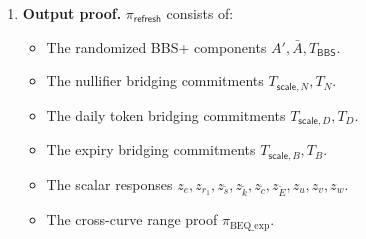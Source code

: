 \documentclass[11pt]{article}
\theoremstyle{definitionstyle}
\theoremstyle{plain}
\begin{document}
\begin{enumerate}[leftmargin=*]
\begin{align*}
    z_e &= \rho_e + c \cdot e_{\mathsf{sub}}, & z_{r_1} &= \rho_{r_1} + c \cdot r_1, \\
    z_{\tilde{s}} &= \rho_{\tilde{s}} + c \cdot \tilde{s}, & z_{\tilde{k}} &= \rho_{\tilde{k}} + c \cdot \tilde{k}, \\
    z_{\tilde{c}} &= \rho_{\tilde{c}} + c \cdot \tilde{c}, & z_{\tilde{E}} &= \rho_{\tilde{E}} + c \cdot \tilde{E}, \\
    z_u &= \rho_u + c \cdot (k_{\mathsf{daily}} r_1), & z_v &= \rho_v + c \cdot (r_{\mathsf{daily}} r_1), \\
    z_w &= \rho_w + c \cdot (r_{\Delta} r_1).
  \end{align*}
\item \textbf{Output proof.}
  $\pi_{\mathsf{refresh}}$ consists of:
  \begin{itemize}[leftmargin=*, nosep]
  \item The randomized BBS+ components $A', \bar{A}, T_{\mathsf{BBS}}$.
  \item The nullifier bridging commitments $T_{\mathsf{scale},N}, T_N$.
  \item The daily token bridging commitments $T_{\mathsf{scale},D}, T_D$.
  \item The expiry bridging commitments $T_{\mathsf{scale},B}, T_B$.
  \item The scalar responses $z_e, z_{r_1}, z_{\tilde{s}}, z_{\tilde{k}}, z_{\tilde{c}}, z_{\tilde{E}}, z_u, z_v, z_w$.
  \item The cross-curve range proof $\pi_{\text{BEQ\_exp}}$.
  \end{itemize}
\end{enumerate}
\end{document}
